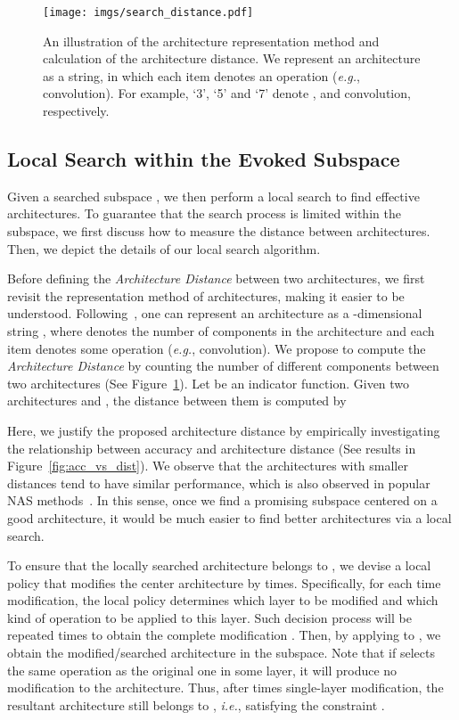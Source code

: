 \documentclass[lettersize,journal]{IEEEtran}
\def\eg{\emph{e.g.}} \def\Eg{\emph{E.g.}}
\def\ie{\emph{i.e.}} \def\Ie{\emph{I.e.}}
\begin{document}
\begin{figure}[t]
\centering
\texttt{[image: imgs/search\_distance.pdf]}
\caption{An illustration of the architecture representation method and calculation of the architecture distance.
We represent an architecture as a string, in which each item denotes an operation (\eg, convolution).
For example, `3', `5' and `7' denote ,  and  convolution, respectively.
}
\label{fig:arch_representation}
\end{figure}

\subsection{Local Search within the Evoked Subspace}
\label{sec:local_search}

Given a searched subspace ,
we then perform a local search to find effective architectures.
To guarantee that the search process is limited within the subspace,
we first discuss how to measure the distance between architectures. 
Then, we depict the details of our local search algorithm.


Before defining the \emph{Architecture Distance} between two architectures, we first revisit the representation method of architectures, making it easier to be understood.
Following~\cite{Cai2020Once,pham2018efficient}, one can represent an architecture as a -dimensional string , where  denotes the number of components in the architecture and each item  denotes some operation (\eg, convolution).
We propose to compute the \emph{Architecture Distance}  by counting the number of different components between two architectures (See Figure~\ref{fig:arch_representation}).
Let  be an indicator function.
Given two architectures  and , the distance between them is computed by



Here, we justify the proposed architecture distance by empirically investigating the relationship between accuracy and architecture distance (See results in Figure~\ref{fig:acc_vs_dist}).
We observe that the architectures with smaller distances tend to have similar performance, which is also observed in popular NAS methods~\cite{ying2019bench,guo2020breaking}. 
In this sense, once we find a promising subspace centered on a good architecture, it would be much easier to find better architectures via a local search.

To ensure that the locally searched architecture  belongs to , 
we devise a local policy  that modifies the center architecture  by  times. Specifically, for each time modification, the local policy  determines which layer to be modified and which kind of operation to be applied to this layer. 
Such decision process will be repeated  times to obtain the complete modification . Then, by applying  to , we obtain the modified/searched architecture  in the subspace. Note that if  selects the same operation as the original one in some layer, it will produce no modification to the architecture. Thus, after  times single-layer modification, the resultant architecture  still belongs to , \ie, satisfying the constraint .
\end{document}
